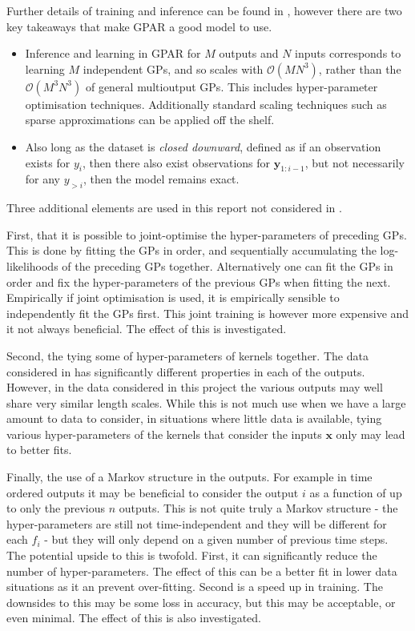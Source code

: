 Further details of training and inference can be found in \citet{Requeima2018}, however there are two key takeaways that make GPAR a good model to use.
\begin{itemize}
	\item Inference and learning in GPAR for \( M \) outputs and \( N \) inputs corresponds to learning \( M \) independent GPs, and so scales with \( \mathcal{O}(MN^3) \), rather than the \( \mathcal{O}(M^3N^3) \) of general multioutput GPs. This includes hyper-parameter optimisation techniques. Additionally standard scaling techniques such as sparse approximations can be applied off the shelf.
	\item  Also long as the dataset is \textit{closed downward}, defined as if an observation exists for \( y_i \), then there also exist observations for \( \mathbf{y}_{1:i-1} \), but not necessarily for any \( y_{>i} \), then the model remains exact.
\end{itemize}
Three additional elements are used in this report not considered in \citet{Requeima2018}. 

First, that it is possible to joint-optimise the hyper-parameters of preceding GPs. This is done by fitting the GPs in order, and sequentially accumulating the log-likelihoods of the preceding GPs together. Alternatively one can fit the GPs in order and fix the hyper-parameters of the previous GPs when fitting the next. Empirically if joint optimisation is used, it is empirically sensible to independently fit the GPs first. This joint training is however more expensive and it not always beneficial. The effect of this is investigated.

Second, the tying some of hyper-parameters of kernels together. The data considered in \cite{Requeima2018} has significantly different properties in each of the outputs. However, in the data considered in this project the various outputs may well share very similar length scales. While this is not much use when we have a large amount to data to consider, in situations where little data is available, tying various hyper-parameters of the kernels that consider the inputs \( \mathbf{x} \) only may lead to better fits.

Finally, the use of a Markov structure in the outputs. For example in time ordered outputs it may be beneficial to consider the output \( i \) as a function of up to only the previous \( n \) outputs. This is not quite truly a Markov structure - the hyper-parameters are still not time-independent and they will be different for each \( f_i \) - but they will only depend on a given number of previous time steps. The potential upside to this is twofold. First, it can significantly reduce the number of hyper-parameters. The effect of this can be a better fit in lower data situations as it an prevent over-fitting. Second is a speed up in training. The downsides to this may be some loss in accuracy, but this may be acceptable, or even minimal. The effect of this is also investigated.

